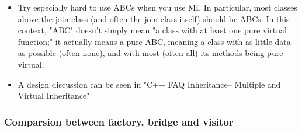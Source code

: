 \documentclass[a4paper,11pt,twoside]{book}
\begin{document}
\begin{itemize}
	
	\item Try especially hard to use ABCs when you use MI. In particular, most classes above the join class (and often the join class itself) should be ABCs. In this context, "ABC" doesn't simply mean "a class with at least one pure virtual function;" it actually means a pure ABC, meaning a class with as little data as possible (often none), and with most (often all) its methods being pure virtual.
	
    \item A design discussion can be seen in "C++ FAQ Inheritance-- Multiple and Virtual Inheritance"
	
\end{itemize}

\subsubsection{Comparsion between factory, bridge and visitor}
\end{document}
